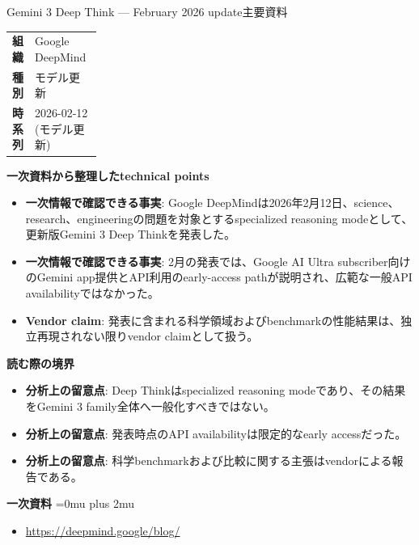 \begin{technicalnote}{Gemini 3 Deep Think — February 2026 update}{主要資料}
\begingroup
\begin{tabularx}{\linewidth}{@{}>{\bfseries}p{0.22\linewidth}X@{}}
組織 & Google DeepMind \\
種別 & モデル更新 \\
時系列 & 2026-02-12 (モデル更新) \\
\end{tabularx}
\smallskip
{\bfseries 一次資料から整理したtechnical points}
\begin{itemize}[leftmargin=1.5em,itemsep=0.35em]
\item \textbf{一次情報で確認できる事実}: Google DeepMindは2026年2月12日、science、research、engineeringの問題を対象とするspecialized reasoning modeとして、更新版Gemini 3 Deep Thinkを発表した。
\item \textbf{一次情報で確認できる事実}: 2月の発表では、Google AI Ultra subscriber向けのGemini app提供とAPI利用のearly-access pathが説明され、広範な一般API availabilityではなかった。
\item \textbf{Vendor claim}: 発表に含まれる科学領域およびbenchmarkの性能結果は、独立再現されない限りvendor claimとして扱う。
\end{itemize}
\begin{minipage}{\linewidth}
{\bfseries 読む際の境界}
\begin{itemize}[leftmargin=1.5em,itemsep=0.35em]
\item \textbf{分析上の留意点}: Deep Thinkはspecialized reasoning modeであり、その結果をGemini 3 family全体へ一般化すべきではない。
\item \textbf{分析上の留意点}: 発表時点のAPI availabilityは限定的なearly accessだった。
\item \textbf{分析上の留意点}: 科学benchmarkおよび比較に関する主張はvendorによる報告である。
\end{itemize}
\begin{samepage}
{\bfseries 一次資料}
\begingroup\sloppy
\Urlmuskip=0mu plus 2mu\relax
\begin{itemize}[leftmargin=1.5em,itemsep=0.25em]
\item {\scriptsize\url{https://deepmind.google/blog/}}
\end{itemize}
\endgroup
\end{samepage}
\end{minipage}
\endgroup
\end{technicalnote}
\medskip

